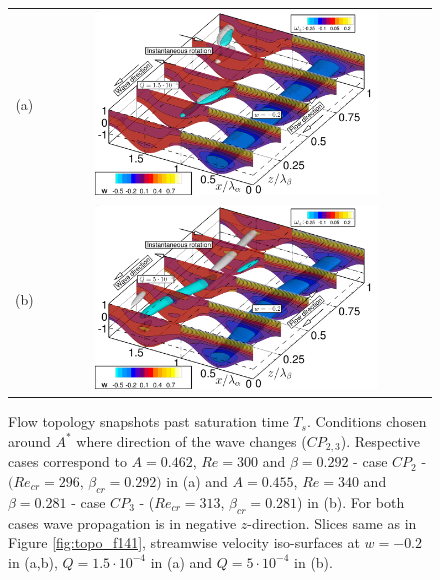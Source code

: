 \documentclass[lineno]{jfm}
\begin{document}
\begin{figure}
\centering
\begin{tabular}{cc}
    (a) & \includegraphics[width=0.75\textwidth]{figure15a.png} \\
    (b) & \includegraphics[width=0.75\textwidth]{figure15b.png} \\
\end{tabular}
\caption{Flow topology snapshots past saturation time $T_s$. Conditions chosen around $A^*$ where direction of the wave changes ($CP_{2,3}$). Respective cases correspond to $A=0.462$, $Re=300$ and $\beta=0.292$ - case $CP_2$ - $(Re_{cr}=296$, $\beta_{cr}=0.292)$ in (a)
and
$A=0.455$, $Re=340$ and $\beta=0.281$ - case $CP_3$ - ($Re_{cr}=313$, $\beta_{cr}=0.281$) in (b).
For both cases wave propagation is in negative $z$-direction.
Slices same as in Figure \ref{fig:topo_f141},
streamwise velocity iso-surfaces at $w=-0.2$ in (a,b), $Q=1.5\cdot10^{-4}$ in (a)
and $Q=5\cdot10^{-4}$ in (b).}
\label{fig:topo_f0924}
\end{figure}
\end{document}
